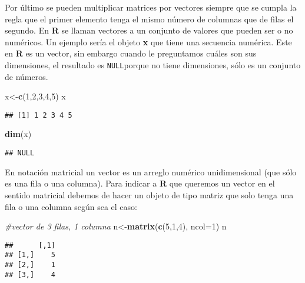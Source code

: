 \documentclass[
]{article}
\newenvironment{Shaded}{\begin{snugshade}}{\end{snugshade}}
\newcommand{\CommentTok}[1]{\textcolor[rgb]{0.56,0.35,0.01}{\textit{#1}}}
\newcommand{\DataTypeTok}[1]{\textcolor[rgb]{0.13,0.29,0.53}{#1}}
\newcommand{\DecValTok}[1]{\textcolor[rgb]{0.00,0.00,0.81}{#1}}
\newcommand{\KeywordTok}[1]{\textcolor[rgb]{0.13,0.29,0.53}{\textbf{#1}}}
\newcommand{\NormalTok}[1]{#1}
\begin{document}
Por último se pueden multiplicar matrices por vectores siempre que se
cumpla la regla que el primer elemento tenga el mismo número de columnas
que de filas el segundo. En \textbf{R} se llaman vectores a un conjunto
de valores que pueden ser o no numéricos. Un ejemplo sería el objeto
\textbf{x} que tiene una secuencia numérica. Este en \textbf{R} es un
vector, sin embargo cuando le preguntamos cuáles son sus dimensiones, el
resultado es \texttt{NULL}porque no tiene dimensiones, sólo es un
conjunto de números.

\begin{Shaded}
\begin{Highlighting}[]
\NormalTok{x\textless{}{-}}\KeywordTok{c}\NormalTok{(}\DecValTok{1}\NormalTok{,}\DecValTok{2}\NormalTok{,}\DecValTok{3}\NormalTok{,}\DecValTok{4}\NormalTok{,}\DecValTok{5}\NormalTok{)}
\NormalTok{x}
\end{Highlighting}
\end{Shaded}

\begin{verbatim}
## [1] 1 2 3 4 5
\end{verbatim}

\begin{Shaded}
\begin{Highlighting}[]
\KeywordTok{dim}\NormalTok{(x)}
\end{Highlighting}
\end{Shaded}

\begin{verbatim}
## NULL
\end{verbatim}

En notación matricial un vector es un arreglo numérico unidimensional
(que sólo es una fila o una columna). Para indicar a \textbf{R} que
queremos un vector en el sentido matricial debemos de hacer un objeto de
tipo matriz que solo tenga una fila o una columna según sea el caso:

\begin{Shaded}
\begin{Highlighting}[]
\CommentTok{\#vector de 3 filas, 1 columna}
\NormalTok{n\textless{}{-}}\KeywordTok{matrix}\NormalTok{(}\KeywordTok{c}\NormalTok{(}\DecValTok{5}\NormalTok{,}\DecValTok{1}\NormalTok{,}\DecValTok{4}\NormalTok{), }\DataTypeTok{ncol=}\DecValTok{1}\NormalTok{)}
\NormalTok{n}
\end{Highlighting}
\end{Shaded}

\begin{verbatim}
##      [,1]
## [1,]    5
## [2,]    1
## [3,]    4
\end{verbatim}
\end{document}
